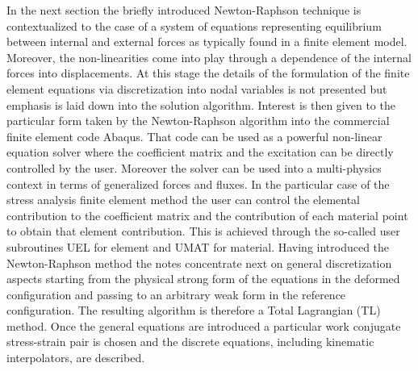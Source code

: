 In the next section the briefly introduced Newton-Raphson technique is contextualized to the case of a system of equations representing equilibrium between internal and external forces as typically found in a finite element model.  Moreover, the non-linearities come into play through a dependence of the internal forces into displacements.  At this stage the details of the formulation of the finite element equations via discretization into nodal variables is not presented but emphasis is laid down into the solution algorithm.  Interest is then given to the particular form taken by the Newton-Raphson algorithm into the commercial finite element code Abaqus.  That code can be used as a powerful non-linear equation solver where the coefficient matrix and the excitation can be directly controlled by the user.  Moreover the solver can be used into a multi-physics context in terms of generalized forces and fluxes.  In the particular case of the stress analysis finite element method the user can control the elemental contribution to the coefficient matrix and the contribution of each material point to obtain that element contribution.  This is achieved through the so-called user subroutines UEL  for element and UMAT  for material.  Having introduced the Newton-Raphson method the notes concentrate next on general discretization aspects starting from the physical strong form of the equations in the deformed configuration and passing to an arbitrary weak form in the reference configuration.  The resulting algorithm is therefore a Total Lagrangian (TL) method.  Once the general equations are introduced a particular work conjugate stress-strain pair is chosen and the discrete equations, including kinematic interpolators, are described.

